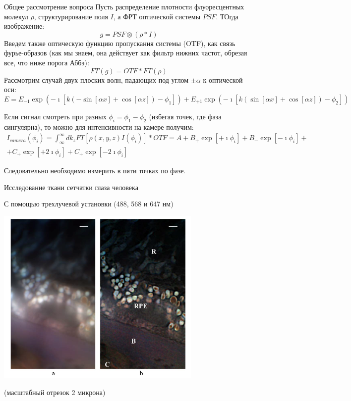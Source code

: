 \documentclass[9pt, compress, xcolor=table]{beamer}
\begin{document}
\begin{frame}{Общее рассмотрение вопроса}
{\small Пусть распределение плотности флуоресцентных молекул $\rho$, структурирование поля $I$, а ФРТ оптической системы $PSF$. ТОгда изображение:}
\begin{equation*}
g=PSF\otimes(\rho*I)
\end{equation*}
{\small Введем также оптическую функцию пропускания системы (OTF), как связь фурье-образов (как мы знаем, она действует как фильтр нижних частот, обрезая все, что ниже порога Аббэ):}
\begin{equation*}
FT(g)=OTF* FT(\rho)
\end{equation*}
{\small Рассмотрим случай двух плоских волн, падающих под углом $\pm\alpha$ к оптической оси:}
\begin{equation*}
E=E_{-1}\exp (-\imath[k(-\sin[\alpha x]+\cos[\alpha z])-\phi_1])+E_{+1}\exp (-\imath[k(\sin[\alpha x]+\cos[\alpha z])-\phi_2])
\end{equation*}

Если сигнал смотреть при разных $\phi_i=\phi_1-\phi_2$ (избегая точек, где фаза сингулярна), то можно для интенсивности на камере получим:
\begin{multline*}
I_{camera}(\phi_i) = \int_{\infty}^{\infty}dk_z
 FT[\rho(x,y,z) I(\phi_i)]*OTF=A+B_{+}\exp[+\imath \phi_i]+B_{-}\exp[-\imath \phi_i]+\\+C_{+}\exp[+2\imath \phi_i]+C_{+}\exp[-2\imath \phi_i]\end{multline*}

Следовательно необходимо измерить в пяти точках по фазе.

\end{frame}

\begin{frame}{Исследование ткани сетчатки глаза человека}

С помощью трехлучевой установки (488, 568 и 647 нм)
\begin{center}
\includegraphics[width=0.75\textwidth]{sim11}
\end{center}
(масштабный отрезок 2 микрона)
\end{frame}
\end{document}
